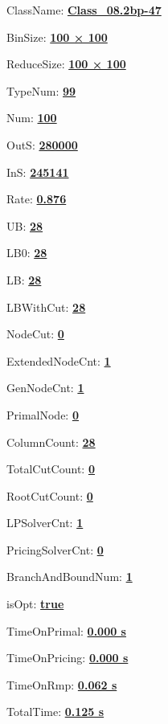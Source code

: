 \documentclass[11pt]{article}
\begin{document}
\pagestyle{empty}


ClassName: \underline{\textbf{Class_08.2bp-47}}
\par
BinSize: \underline{\textbf{100 × 100}}
\par
ReduceSize: \underline{\textbf{100 × 100}}
\par
TypeNum: \underline{\textbf{99}}
\par
Num: \underline{\textbf{100}}
\par
OutS: \underline{\textbf{280000}}
\par
InS: \underline{\textbf{245141}}
\par
Rate: \underline{\textbf{0.876}}
\par
UB: \underline{\textbf{28}}
\par
LB0: \underline{\textbf{28}}
\par
LB: \underline{\textbf{28}}
\par
LBWithCut: \underline{\textbf{28}}
\par
NodeCut: \underline{\textbf{0}}
\par
ExtendedNodeCnt: \underline{\textbf{1}}
\par
GenNodeCnt: \underline{\textbf{1}}
\par
PrimalNode: \underline{\textbf{0}}
\par
ColumnCount: \underline{\textbf{28}}
\par
TotalCutCount: \underline{\textbf{0}}
\par
RootCutCount: \underline{\textbf{0}}
\par
LPSolverCnt: \underline{\textbf{1}}
\par
PricingSolverCnt: \underline{\textbf{0}}
\par
BranchAndBoundNum: \underline{\textbf{1}}
\par
isOpt: \underline{\textbf{true}}
\par
TimeOnPrimal: \underline{\textbf{0.000 s}}
\par
TimeOnPricing: \underline{\textbf{0.000 s}}
\par
TimeOnRmp: \underline{\textbf{0.062 s}}
\par
TotalTime: \underline{\textbf{0.125 s}}
\par
\newpage


\end{document}
